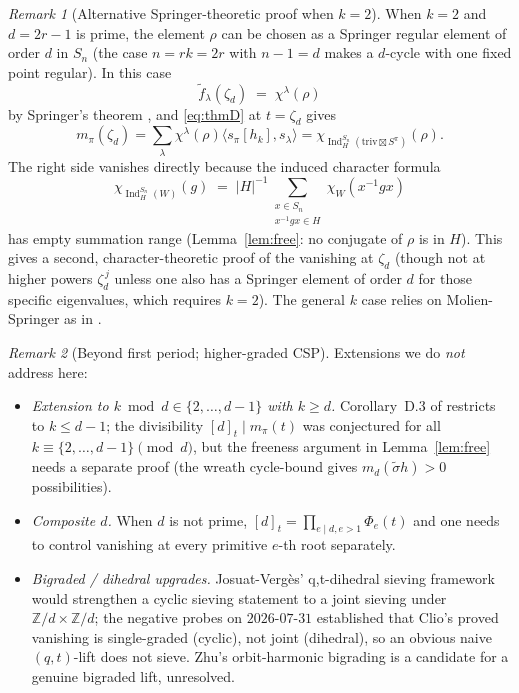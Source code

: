 \documentclass[11pt]{article}
\theoremstyle{definition}
\theoremstyle{remark}
\newtheorem*{remark}{Remark}
\newcommand{\Ind}{\operatorname{Ind}}
\newcommand{\triv}{\mathrm{triv}}
\newcommand{\fdeg}{\widetilde{f}}
\newcommand{\ZZ}{\mathbb{Z}}
\begin{document}
\begin{remark}[Alternative Springer-theoretic proof when $k = 2$]
When $k = 2$ and $d = 2r - 1$ is prime, the element $\rho$ can be chosen as a Springer regular element of order $d$ in $S_n$ (the case $n = rk = 2r$ with $n - 1 = d$ makes a $d$-cycle with one fixed point regular).  In this case
\[
\fdeg_\lambda(\zeta_d) \;=\; \chi^\lambda(\rho)
\]
by Springer's theorem \cite{Springer}, and \eqref{eq:thmD} at $t = \zeta_d$ gives
\[
m_\pi(\zeta_d) = \sum_\lambda \chi^\lambda(\rho) \langle s_\pi[h_k], s_\lambda\rangle = \chi_{\Ind_H^{S_n}(\triv\boxtimes S^\pi)}(\rho).
\]
The right side vanishes directly because the induced character formula
\[
\chi_{\Ind_H^{S_n}(W)}(g) \;=\; |H|^{-1}\sum_{\substack{x \in S_n \\ x^{-1}gx \in H}} \chi_W(x^{-1}gx)
\]
has empty summation range (Lemma~\ref{lem:free}: no conjugate of $\rho$ is in $H$).  This gives a second, character-theoretic proof of the vanishing at $\zeta_d$ (though not at higher powers $\zeta_d^{\,j}$ unless one also has a Springer element of order $d$ for those specific eigenvalues, which requires $k = 2$).  The general $k$ case relies on Molien-Springer as in \cite{Wreath-general-r}.
\end{remark}

\begin{remark}[Beyond first period; higher-graded CSP]
Extensions we do \emph{not} address here:
\begin{itemize}
\item \emph{Extension to $k \bmod d \in \{2, \ldots, d - 1\}$ with $k \ge d$.}  Corollary~D.3 of \cite{Wreath-general-r} restricts to $k \le d - 1$; the divisibility $[d]_t \mid m_\pi(t)$ was conjectured for all $k \equiv \{2, \ldots, d-1\} \pmod d$, but the freeness argument in Lemma~\ref{lem:free} needs a separate proof (the wreath cycle-bound gives $m_d(\tilde\sigma h) > 0$ possibilities).

\item \emph{Composite $d$.}  When $d$ is not prime, $[d]_t = \prod_{e \mid d, e > 1} \Phi_e(t)$ and one needs to control vanishing at every primitive $e$-th root separately.

\item \emph{Bigraded / dihedral upgrades.}  Josuat-Verg\`es' q,t-dihedral sieving framework \cite{JosuatVerges} would strengthen a cyclic sieving statement to a joint sieving under $\ZZ/d \times \ZZ/d$; the negative probes on $2026$-$07$-$31$ established that Clio's proved vanishing is single-graded (cyclic), not joint (dihedral), so an obvious naive $(q,t)$-lift does not sieve.  Zhu's orbit-harmonic bigrading \cite{Zhu} is a candidate for a genuine bigraded lift, unresolved.
\end{itemize}
\end{remark}
\end{document}
